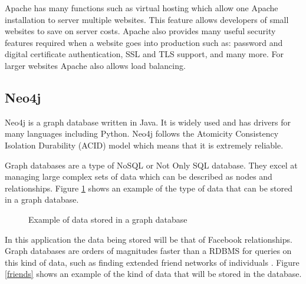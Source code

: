 \documentclass[10pt,onecolumn]{article}
\begin{document}
Apache has many functions such as virtual hosting which allow one Apache installation to server multiple websites. This feature allows developers of small websites to save on server costs. Apache also provides many useful security features required when a website goes into production such as: password and digital certificate authentication, SSL and TLS support, and many more. For larger websites Apache also allows load balancing. 

\subsection{Neo4j}
Neo4j is a graph database written in Java. It is widely used and has drivers for many languages including Python. Neo4j follows the Atomicity Consistency Isolation Durability (ACID) model which means that it is extremely reliable.  

Graph databases are a type of NoSQL or Not Only SQL database. They excel at managing large complex sets of data which can be described as nodes and relationships. Figure \ref{neo4eg} shows an example of the type of data that can be stored in a graph database.

\begin{figure}[htbp]
    \centering
    \caption{Example of data stored in a graph database}
    \label{neo4eg}
\end{figure}

In this application the data being stored will be that of Facebook relationships. Graph databases are orders of magnitudes faster than a RDBMS for queries on this kind of data, such as finding extended friend networks of individuals \cite{graphdbs}.  Figure \ref{friends} shows an example of the kind of data that will be stored in the database.
\end{document}
